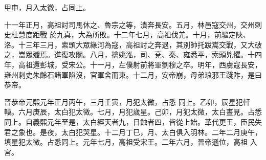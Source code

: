 \begin{pinyinscope}
 甲申，月入太微，占同上。



 十一年正月，高祖討司馬休之、魯宗之等，潰奔長安。五月，林邑寇交州，交州刺史杜慧度距戰
 於九真，大為所敗。十二年七月，高祖伐羌。十月，前驅定陜、洛。十三年三月，索頭大眾緣河為寇，高祖討之奔退，其別帥托跋嵩交戰，又大破之，嵩眾殲焉。進復攻關。八月，擒姚泓，司、兗、秦、雍悉平，索頭兇懼。十四年，高祖還彭城，受宋公。十一月，左僕射前將軍劉穆之卒。明年，西虜寇長安，雍州刺史朱齡石諸軍陷沒，官軍舍而東。十二月，安帝崩，母弟琅邪王踐阼，是曰恭帝。



 晉恭帝元熙元年正月丙午，三月壬寅，月犯太微，占悉
 同上。乙卯，辰星犯軒轅。六月庚辰，太白犯太微。七月，月犯歲星。己卯，月犯太微，太白晝見。占悉同上。自義熙元年至是，太白經天者九，日蝕者四，皆從上始。革代更王，臣民失君之象也。是夜，太白犯哭星。十二月丁巳，月、太白俱入羽林。二年二月庚午，填星犯太微。占悉同上。元年七月，高祖受宋王。二年六月，晉帝遜位，高祖
 入宮。



\end{pinyinscope}